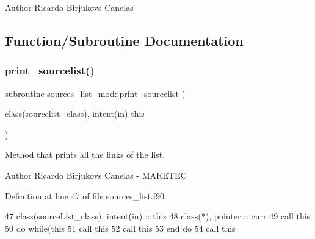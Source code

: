 \begin{DoxyAuthor}{Author}
Ricardo Birjukovs Canelas 
\end{DoxyAuthor}


\subsection{Function/\+Subroutine Documentation}
\mbox{\label{namespacesources__list__mod_ac9ab885c3cc6a38c8b12b694e40a11e1}} 
\subsubsection{\texorpdfstring{print\+\_\+sourcelist()}{print\_sourcelist()}}
{\footnotesize\ttfamily subroutine sources\+\_\+list\+\_\+mod\+::print\+\_\+sourcelist (\begin{DoxyParamCaption}\item[{class(\mbox{\hyperlink{structsources__list__mod_1_1sourcelist__class}{sourcelist\+\_\+class}}), intent(in)}]{this }\end{DoxyParamCaption})\hspace{0.3cm}{\ttfamily [private]}}



Method that prints all the links of the list. 

\begin{DoxyAuthor}{Author}
Ricardo Birjukovs Canelas -\/ M\+A\+R\+E\+T\+EC 
\end{DoxyAuthor}


Definition at line 47 of file sources\+\_\+list.\+f90.


\begin{DoxyCode}
47     \textcolor{keywordtype}{class}(sourceList\_class), \textcolor{keywordtype}{intent(in)} :: this
48     \textcolor{keywordtype}{class}(*), \textcolor{keywordtype}{pointer} :: curr
49     \textcolor{keyword}{call }this%
50     \textcolor{keywordflow}{do} \textcolor{keywordflow}{while}(this%
51         \textcolor{keyword}{call }this%
52         \textcolor{keyword}{call }this%
53 \textcolor{keywordflow}{    end do}
54     \textcolor{keyword}{call }this%
\end{DoxyCode}
\mbox{\label{namespacesources__list__mod_aad2008cc97f57cd85297d3f3d81fac39}} 
